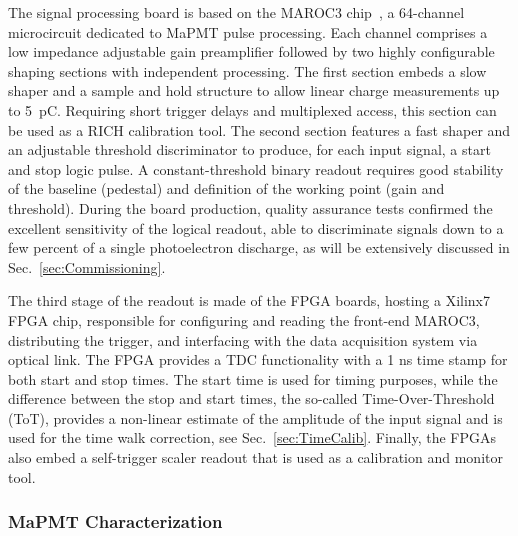 \documentclass[5p,times,twocolumn]{elsarticle}
\begin{document}
The signal processing board is based on the MAROC3 chip~\cite{MAROC3:chip}, a 64-channel microcircuit
dedicated to MaPMT pulse processing. Each channel comprises a low impedance adjustable gain preamplifier followed
by two highly configurable shaping sections with independent processing. The first section embeds a slow shaper and
a sample and hold structure to allow linear charge measurements up to 5~pC. Requiring short trigger delays and
multiplexed access, this section can be used as a RICH calibration tool. The second section features a fast shaper and
an adjustable threshold discriminator to produce, for each input signal, a start and stop logic pulse. A constant-threshold
binary readout requires good stability of the baseline (pedestal) and definition of the working point (gain and
threshold). During the board production, quality assurance tests confirmed the excellent sensitivity of the logical
readout, able to discriminate signals down to a few percent of a single photoelectron discharge, as will be extensively
discussed in Sec.~\ref{sec:Commissioning}.

The third stage of the readout is made of the FPGA boards, hosting a Xilinx7 FPGA chip, responsible for configuring
and reading the front-end MAROC3, distributing the trigger, and interfacing with the data acquisition system
\cite{daq-nim} via optical link. The FPGA provides a TDC functionality with a 1 ns time stamp for both start and stop
times. The start time is used for timing purposes, while the difference between the stop and start times, the so-called
Time-Over-Threshold (ToT), provides a non-linear estimate of the amplitude of the input signal and is used for the time
walk correction, see Sec.~\ref{sec:TimeCalib}. Finally, the FPGAs also embed a self-trigger scaler readout that is used
as a calibration and monitor tool.

\subsubsection{MaPMT Characterization}
\label{sec:FEtests}
\end{document}
